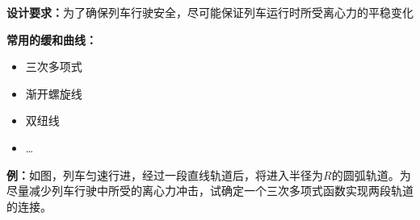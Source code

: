 \begin{center}
\end{center}

{\bf 设计要求：}为了确保列车行驶安全，尽可能保证列车运行时所受离心力的平稳变化

{\bf 常用的缓和曲线：}

\begin{itemize}
  \setlength{\itemindent}{1cm}
  \item {三次多项式}
  \item {渐开螺旋线}
  \item {双纽线}
  \item {\ldots}
\end{itemize}

{\bf 例：}如图，列车匀速行进，经过一段直线轨道后，将进入半径为$R$的圆弧轨道。为
尽量减少列车行驶中所受的离心力冲击，试确定一个三次多项式函数实现两段轨道的连接。

\begin{center}
\end{center}

